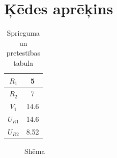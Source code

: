 \documentclass{report}
\begin{document}
\section{Ķēdes aprēķins}
\begin {table}[h]
\begin{tabular}{|c|c|}
\hline
$R_1$ & 5\\
\hline
$R_2$ & 7  \\
\hline
$V_1$ & 14.6  \\
\hline
$U_{R1}$ & 14.6  \\
\hline
$U_{R2}$ & 8.52  \\
\hline

\end{tabular}
\caption {Sprieguma un pretestības tabula}
\end {table}
\begin{figure}[h]
    \centering
    \caption{Shēma}
    \label{fig:my_label1}
\end{figure}
\end{document}
